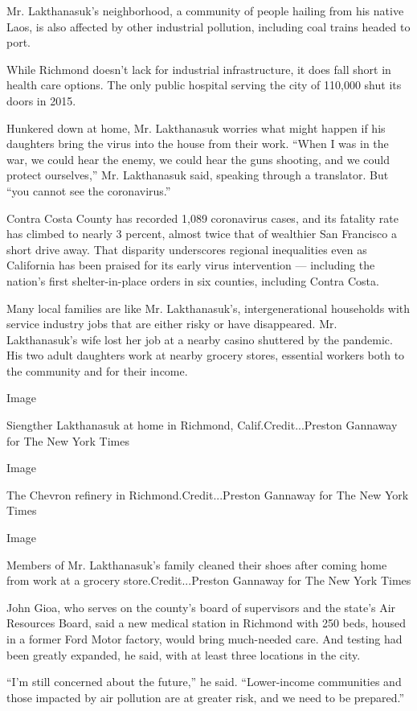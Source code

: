 Mr. Lakthanasuk's neighborhood, a community of people hailing from his
native Laos, is also affected by other industrial pollution, including
coal trains headed to port.

While Richmond doesn't lack for industrial infrastructure, it does fall
short in health care options. The only public hospital serving the city
of 110,000 shut its doors in 2015.

Hunkered down at home, Mr. Lakthanasuk worries what might happen if his
daughters bring the virus into the house from their work. ``When I was
in the war, we could hear the enemy, we could hear the guns shooting,
and we could protect ourselves,'' Mr. Lakthanasuk said, speaking through
a translator. But ``you cannot see the coronavirus.''

Contra Costa County has recorded 1,089 coronavirus cases, and its
fatality rate has climbed to nearly 3 percent, almost twice that of
wealthier San Francisco a short drive away. That disparity underscores
regional inequalities even as California has been praised for its early
virus intervention --- including the nation's first shelter-in-place
orders in six counties, including Contra Costa.

Many local families are like Mr. Lakthanasuk's, intergenerational
households with service industry jobs that are either risky or have
disappeared. Mr. Lakthanasuk's wife lost her job at a nearby casino
shuttered by the pandemic. His two adult daughters work at nearby
grocery stores, essential workers both to the community and for their
income.

Image

Siengther Lakthanasuk at home in Richmond, Calif.Credit...Preston
Gannaway for The New York Times

Image

The Chevron refinery in Richmond.Credit...Preston Gannaway for The New
York Times

Image

Members of Mr. Lakthanasuk's family cleaned their shoes after coming
home from work at a grocery store.Credit...Preston Gannaway for The New
York Times

John Gioa, who serves on the county's board of supervisors and the
state's Air Resources Board, said a new medical station in Richmond with
250 beds, housed in a former Ford Motor factory, would bring much-needed
care. And testing had been greatly expanded, he said, with at least
three locations in the city.

``I'm still concerned about the future,'' he said. ``Lower-income
communities and those impacted by air pollution are at greater risk, and
we need to be prepared.''

